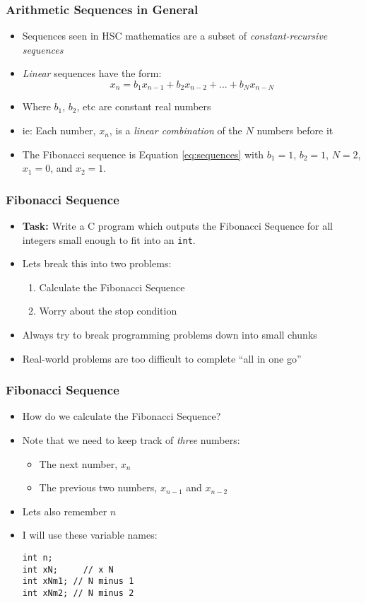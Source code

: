 \documentclass[14pt]{beamer}
\begin{document}
\begin{frame}
\frametitle{Arithmetic Sequences in General}
\begin{itemize}
\item Sequences seen in HSC mathematics are a subset of \textit{constant-recursive sequences}
\item \textit{Linear} sequences have the form:
\begin{equation}\label{eq:sequences}
x_n = b_1x_{n-1} + b_2x_{n-2} + ... + b_Nx_{n-N}
\end{equation}
\item Where $b_1$, $b_2$, etc are constant real numbers
\item ie: Each number, $x_n$, is a \textit{linear combination} of the $N$ numbers before it
\item The Fibonacci sequence is Equation \eqref{eq:sequences} with $b_1 = 1$, $b_2 = 1$, $N = 2$, $x_1 = 0$, and $x_2 = 1$.
\end{itemize}
\end{frame}

\begin{frame}
\frametitle{Fibonacci Sequence}
\begin{itemize}
\item \textbf{Task:} Write a C program which outputs the Fibonacci Sequence for all integers small enough to fit into an \texttt{int}.
\item Lets break this into two problems:
	\begin{enumerate}
		\item Calculate the Fibonacci Sequence
		\item Worry about the stop condition
	\end{enumerate}
\item Always try to break programming problems down into small chunks
\item Real-world problems are too difficult to complete ``all in one go''
\end{itemize}
\end{frame}


\begin{frame}[fragile]
\frametitle{Fibonacci Sequence}
\begin{itemize}
	\item How do we calculate the Fibonacci Sequence?
	\item Note that we need to keep track of \textit{three} numbers:
		\begin{itemize}
			\item The next number, $x_n$
			\item The previous two numbers, $x_{n-1}$ and $x_{n-2}$
		\end{itemize}
	\item Lets also remember $n$
	\item I will use these variable names:
		\begin{lstlisting}[style=CStyle]
int n;
int xN;		// x N
int xNm1; // N minus 1
int xNm2; // N minus 2
\end{lstlisting}
\end{itemize}
\end{frame}
\end{document}

